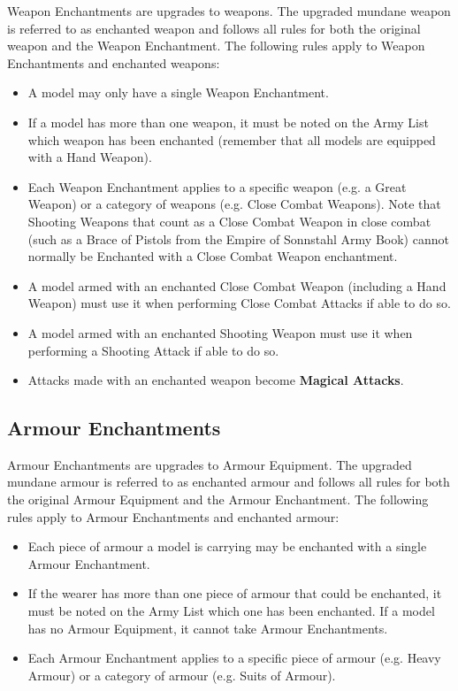 Weapon Enchantments are upgrades to weapons. The upgraded mundane weapon is referred to as enchanted weapon and follows all rules for both the original weapon and the Weapon Enchantment. The following rules apply to Weapon Enchantments and enchanted weapons:
\begin{itemize}
	\item A model may only have a single Weapon Enchantment.
	\item If a model has more than one weapon, it must be noted on the Army List which weapon has been enchanted (remember that all models are equipped with a Hand Weapon).
	\item Each Weapon Enchantment applies to a specific weapon (e.g. a Great Weapon) or a category of weapons (e.g. Close Combat Weapons). Note that Shooting Weapons that count as a Close Combat Weapon in close combat (such as a Brace of Pistols from the Empire of Sonnstahl Army Book) cannot normally be Enchanted with a Close Combat Weapon enchantment.
	\item A model armed with an enchanted Close Combat Weapon (including a Hand Weapon) must use it  when performing Close Combat Attacks if able to do so.
	\item A model armed with an enchanted Shooting Weapon must use it when performing a Shooting Attack if able to do so.
	\item Attacks made with an enchanted weapon become \textbf{Magical Attacks}.
\end{itemize}

\subsection{Armour Enchantments}
\label{armour_enchantments}

Armour Enchantments are upgrades to Armour Equipment. The upgraded mundane armour is referred to as enchanted armour and follows all rules for both the original Armour Equipment and the Armour Enchantment. The following rules apply to Armour Enchantments and enchanted armour:
\begin{itemize}
	\item Each piece of armour a model is carrying may be enchanted with a single Armour Enchantment.
	\item If the wearer has more than one piece of armour that could be enchanted, it must be noted on the Army List which one has been enchanted. If a model has no Armour Equipment, it cannot take Armour Enchantments.
	\item Each Armour Enchantment applies to a specific piece of armour (e.g. Heavy Armour) or a category of armour (e.g. Suits of Armour).
\end{itemize}

